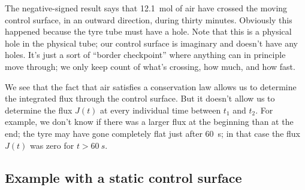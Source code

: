 \documentclass[a4paper,12pt,%
onecolumn,oneside,titlepage,%
british%
]{memoir}
\renewcommand*{\|}[1][]{\nonscript\:#1\vert\nonscript\:\mathopen{}}
\newcommand*{\yJ}{J}
\begin{document}
The negative-signed result says that \qty{12.1}{mol} of air have crossed the moving control surface, in an outward direction, during thirty minutes. Obviously this happened because the tyre tube must have a hole.
%
Note that this is a physical hole in the physical tube; our control surface is imaginary and doesn't have any holes. It's just a sort of \enquote{border checkpoint} where anything can in principle move through; we only keep count of what's crossing, how much, and how fast.

We see that the fact that air satisfies a conservation law allows us to determine the integrated flux through the control surface. But it doesn't allow us to determine the flux $\yJ(t)$ at every individual time between $t_{1}$ and $t_{2}$. For example, we don't know if there was a larger flux at the beginning than at the end; the tyre may have gone completely flat just after \qty{60}{s}; in that case the flux $\yJ(t)$ was zero for $t>\qty{60}{s}$.

\subsection{Example with a static control surface}
\label{sec:example_conservation_static}
\end{document}
